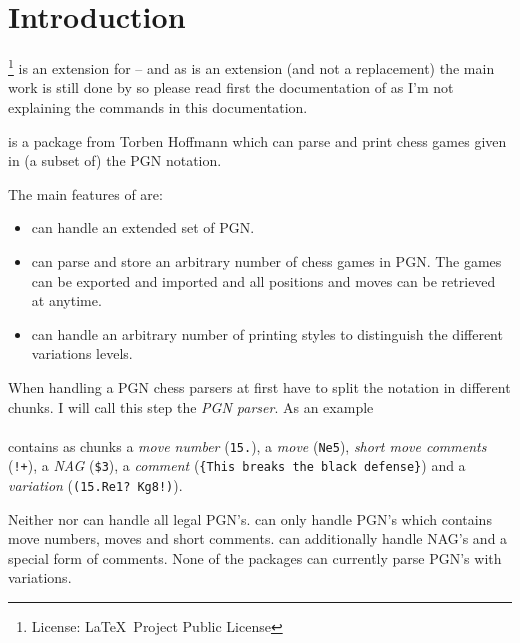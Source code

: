 \documentclass[pagesize,parskip=half-,fontsize=12pt]{scrartcl}
\begin{document}
\section{Introduction}

\Xskak\footnote{License: \LaTeX\ Project Public License} is an extension for \skaksty -- and as \xskak is an extension
(and not a replacement) the main work is still done by \skaksty so
please read first the documentation of \skaksty as I'm not explaining
the  commands in this documentation.


\Skaksty is a package from Torben Hoffmann which can parse and print
chess games given in (a subset of) the PGN notation.

The main features of  are:

\begin{itemize}
\item {} can handle an extended set of PGN.

\item {}
can parse and store an arbitrary number of chess games in PGN. The
games can be exported and imported and all positions and moves can be
retrieved at anytime.

\item {} can
handle an arbitrary number of printing styles to distinguish
the different variations levels.

\end{itemize}


When handling a PGN chess parsers at first have to split the notation
in different chunks. I will call this step the \emph{PGN parser}.
As an example\\[1ex]\mbox{}\\[1ex] contains as
chunks a \emph{move number} (\texttt{15.}), a \emph{move}
(\texttt{Ne5}), \emph{short move comments} (\texttt{!+}), a
\emph{NAG} (\texttt{\$3}), a \emph{comment} (\texttt{\{This breaks
the black defense\}}) and a \emph{variation} (\texttt{(15.Re1?
Kg8!)}).

Neither  nor  can handle all
legal PGN's. \Skaksty can only handle PGN's which contains move
numbers, moves and short comments.  can
additionally handle NAG's and a special form of comments. None of the
packages can currently parse PGN's with variations.
\end{document}
